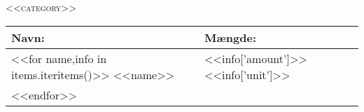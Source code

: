 \begin{center}
\textsc{<<category>>}

\begin{tabular}{|p{5cm}|p{5cm}|}
  \hline
  \bf{Navn:} & \bf{Mængde:} \\
  \hline\hline
  <<for name,info in items.iteritems()>>
    <<name>> & <<info['amount']>> <<info['unit']>> \\
  <<endfor>>
  \hline
\end{tabular}
\end{center}
